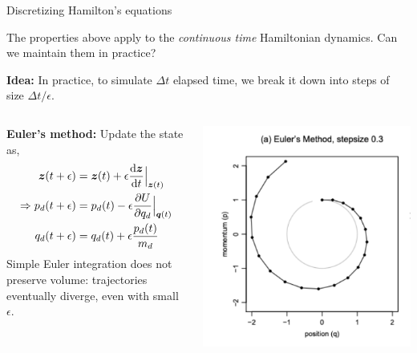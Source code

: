 \documentclass[aspectratio=169]{beamer}
\begin{document}
\begin{frame}{Discretizing Hamilton's equations}

The properties above apply to the \textit{continuous time} Hamiltonian dynamics. Can we maintain them in practice?

\textbf{Idea: } In practice, to simulate $\Delta t$ elapsed time, we break it down into steps of size $\Delta t / \epsilon$.

\vspace{1em}

\begin{columns}
\begin{column}{.66\textwidth}
\textbf{Euler's method: } Update the state as,
\begin{align}
    \boldsymbol{z}(t+\epsilon) &= \boldsymbol{z}(t) + \epsilon \frac{\mathop{}\!\mathrm{d} \boldsymbol{z}}{\mathop{}\!\mathrm{d} t}\Big|_{\boldsymbol{z}(t)} \\
    \Rightarrow 
    p_d(t+\epsilon) &= p_d(t) - \epsilon \frac{\partial U}{\partial q_d} \Big|_{\boldsymbol{q}(t)} \\
    q_d(t+\epsilon) &= q_d(t) + \epsilon \frac{p_d(t)}{m_d}
\end{align}
Simple Euler integration does not preserve volume: trajectories eventually diverge, even with small $\epsilon$.
\end{column}

\begin{column}{.33\textwidth}
\centering
\includegraphics[width=\textwidth]{figures/lap3/euler.pdf}
\end{column}
\end{columns}

\end{frame}
\end{document}
